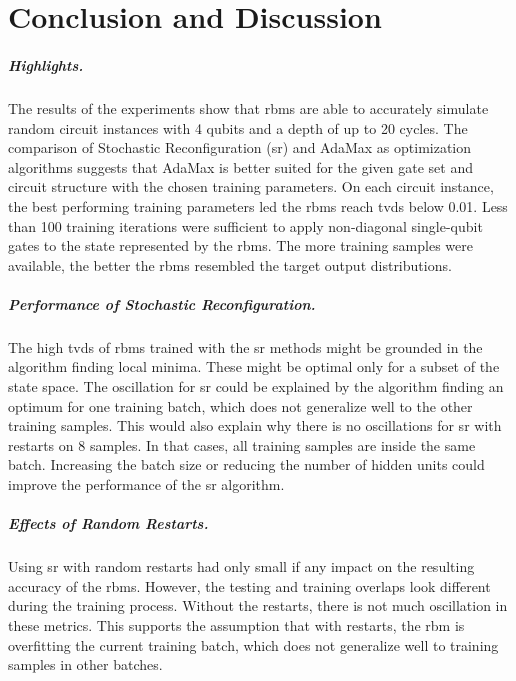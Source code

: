\chapter{Conclusion and Discussion}
\label{sec:discussion}

\paragraph{Highlights.}
The results of the experiments show that \gls{rbm}s are able to accurately simulate random circuit 
instances with 4 qubits and a depth of up to 20 cycles. The comparison of 
Stochastic Reconfiguration (\gls{sr}) and AdaMax as optimization algorithms suggests that 
AdaMax is better suited for the given gate set and circuit structure with the chosen training 
parameters. On each circuit instance, the best performing training parameters led 
the \gls{rbm}s reach \gls{tvd}s below 0.01. Less than 100 training iterations were sufficient to 
apply non-diagonal single-qubit gates to the state represented by the \gls{rbm}s. 
The more training samples were available, the better the \gls{rbm}s resembled the target output distributions.

\paragraph{Performance of Stochastic Reconfiguration.}
The high \gls{tvd}s of \gls{rbm}s trained with the \gls{sr} methods might be grounded in the algorithm finding 
local minima. These might be optimal only for a subset of the state space. The oscillation for \gls{sr} could be explained by the algorithm finding an 
optimum for one training batch, which does not generalize well to the other training samples.
This would also explain why there is no oscillations for \gls{sr} with restarts on 8 samples. In that
cases, all training samples are inside the same batch. Increasing the batch size or reducing the 
number of hidden units could improve the performance of the \gls{sr} algorithm.

\paragraph{Effects of Random Restarts.}
Using \gls{sr} with random restarts had only small if any 
impact on the resulting accuracy of the \gls{rbm}s. However, the testing and training overlaps 
look different during the training process. Without the restarts, there is not much 
oscillation in these metrics. This supports the assumption that with restarts, the 
\gls{rbm} is overfitting the current training batch, which does not generalize well to training 
samples in other batches. 

